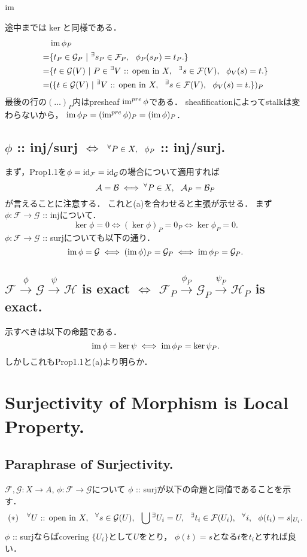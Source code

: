 \documentclass[a4paper]{jsarticle}
\newcommand{\shA}{\mathcal{A}}
\newcommand{\shB}{\mathcal{B}}
\newcommand{\shF}{\mathcal{F}}
\newcommand{\shG}{\mathcal{G}}
\newcommand{\shH}{\mathcal{H}}
\newcommand{\OpenIn}{\text{ :: open in }}
\begin{document}
    \paragraph{$\operatorname{im}$}
    途中までは$\ker$と同様である．
    \begin{align*}
        {}& \im \phi_P \\
        =&  \{ t_P \in \shG_P ~|~ \Exists{s_P \in \shF_P} \phi_P(s_P)=t_P. \} \\
        =&  \{ t \in \shG(V) ~|~ P \in \Exists{V \OpenIn X} \Exists{s \in \shF(V)} \phi_{V}(s)=t. \} \\
        =&  (\{ t \in \shG(V) ~|~ \Exists{V \OpenIn X} \Exists{s \in \shF(V)} \phi_{V}(s)=t. \})_P
    \end{align*}
    最後の行の$(\dots)_P$内はpresheaf $\operatorname{im}^{pre} \phi$である．
    sheafificationによってstalkは変わらないから，
    $\operatorname{im} \phi_P=(\operatorname{im}^{pre} \phi)_P=(\operatorname{im} \phi)_P$．

    \subsection{$\phi$ :: inj/surj $\iff$ ${}^{\forall} P \in X,~~ \phi_P$ :: inj/surj.}
    まず，Prop1.1を$\phi=\id{\shF}=\id{\shG}$の場合について適用すれば
    \[ \shA=\shB \iff \Forall{P \in X} \shA_P=\shB_P \]
    が言えることに注意する．
    これと(a)を合わせると主張が示せる．
    まず$\phi: \shF \to \shG$ :: injについて．
    \[ \ker \phi=0 \iff (\ker \phi)_P=0_P \iff \ker \phi_P=0. \]
    $\phi: \shF \to \shG$ :: surjについても以下の通り．
    \[ \im \phi=\shG \iff (\im \phi)_P= \shG_P \iff \im \phi_P=\shG_P. \]

    \subsection{$\shF \xrightarrow{\phi} \shG \xrightarrow{\psi} \shH$ is exact $\iff$
        $\shF_P \xrightarrow{\phi_P} \shG_P \xrightarrow{\psi_P} \shH_P$ is exact.}
    示すべきは以下の命題である．
    \[ \operatorname{im} \phi=\ker \psi \iff \operatorname{im} \phi_P=\ker \psi_P. \]
    しかしこれもProp1.1と(a)より明らか．


\section{Surjectivity of Morphism is Local Property.} %
    \subsection{Paraphrase of Surjectivity.}
    $\shF, \shG: X \to A$, $\phi: \shF \to \shG$について
    $\phi$ :: surjが以下の命題と同値であることを示す．
    \[
        (*)~~~
        \Forall{U \text{ :: open in } X}
        \Forall{s \in \shG(U)}
        \bigcup {}^\exists U_i=U,~~
        \Exists{t_i \in \shF(U_i)}
        \Forall{i} \phi(t_i)=s|_{U_i}.
    \]
    $\phi$ :: surjならばcovering $\{U_i\}$として$U$をとり，
    $\phi(t)=s$となる$t$を$t_i$とすれば良い．
\end{document}
